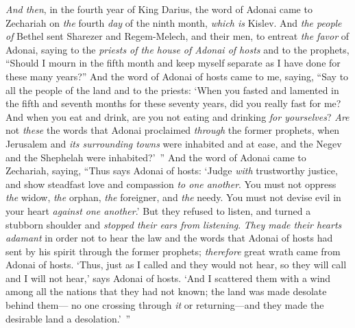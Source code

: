 \begin{biblechapter} %
\verse \textit{And then}, in the fourth year of King Darius, the word of Adonai came to Zechariah on \textit{the} fourth \textit{day} of the ninth month, \textit{which is} Kislev.
\verse And \textit{the people of} Bethel sent Sharezer and Regem-Melech, and their men, to entreat \textit{the favor} of Adonai,
\verse saying to the \textit{priests of the house of Adonai of hosts} and to the prophets, “Should I mourn in the fifth month and keep myself separate as I have done for these many years?”
\verse And the word of Adonai of hosts came to me, saying,
\verse “Say to all the people of the land and to the priests: ‘When you fasted and lamented in the fifth and seventh months for these seventy years, did you really fast for me?
\verse And when you eat and drink, are you not eating and drinking \textit{for yourselves}?
\verse \textit{Are} not \textit{these} the words that Adonai proclaimed \textit{through} the former prophets, when Jerusalem and \textit{its surrounding towns} were inhabited and at ease, and the Negev and the Shephelah were inhabited?’ ”
\verse And the word of Adonai came to Zechariah, saying,
\verse “Thus says Adonai of hosts: ‘Judge \textit{with} trustworthy justice, and show steadfast love and compassion \textit{to one another}.
\verse You must not oppress \textit{the} widow, \textit{the} orphan, \textit{the} foreigner, and \textit{the} needy. You must not devise evil in your heart \textit{against one another}.’
\verse But they refused to listen, and turned a stubborn shoulder and \textit{stopped their ears from listening}.
\verse \textit{They made their hearts adamant} in order not to hear the law and the words that Adonai of hosts had sent by his spirit through the former prophets; \textit{therefore} great wrath came from Adonai of hosts.
\verse ‘Thus, just as I called and they would not hear, so they will call and I will not hear,’ says Adonai of hosts.
\verse ‘And I scattered them with a wind among all the nations that they had not known; the land was made desolate behind them— no one crossing through \textit{it} or returning—and they made the desirable land a desolation.’ ”
\end{biblechapter}

